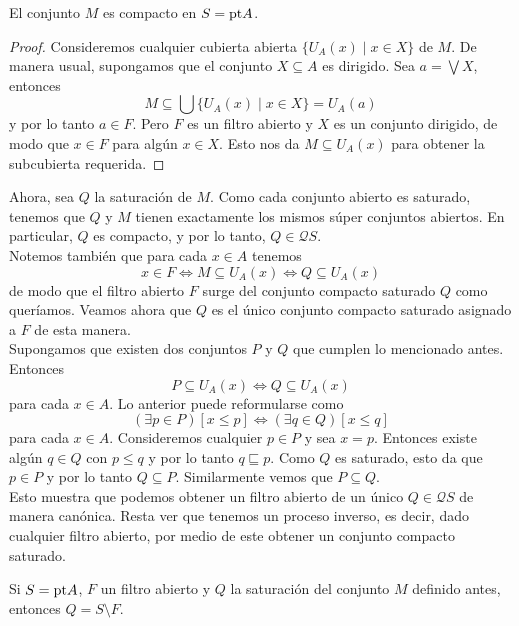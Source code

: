 \begin{lem}
    El conjunto $M$ es compacto en $S=\mathrm{pt} A$.
\end{lem}

\begin{proof}
    Consideremos cualquier cubierta abierta $\{U_A(x)\mid x\in X\}$ de $M$. De manera usual, supongamos que el conjunto $X\subseteq A$ es dirigido. Sea $a=\bigvee X$, entonces
    \[
    M\subseteq \bigcup \{U_A(x)\mid x\in X\}=U_A(a)
    \]
    y por lo tanto $a\in F$. Pero $F$ es un filtro abierto y $X$ es un conjunto dirigido, de modo que $x\in F$ para algún $x\in X$. Esto nos da $M\subseteq U_A(x)$ para obtener la subcubierta requerida.
\end{proof}

Ahora, sea $Q$ la saturación de $M$. Como cada conjunto abierto es saturado, tenemos que $Q$ y $M$ tienen exactamente los mismos súper conjuntos abiertos. En particular, $Q$ es compacto, y por lo tanto, $Q\in \mathcal{Q}S$.\\

Notemos también que para cada $x\in A$ tenemos
\begin{equation}\label{HMcaracterizacion}
x\in F\Leftrightarrow M\subseteq U_A(x)\Leftrightarrow Q\subseteq U_A(x)
\end{equation}
de modo que el filtro abierto $F$ surge del conjunto compacto saturado $Q$ como queríamos. Veamos ahora que $Q$ es el único conjunto compacto saturado asignado a $F$ de esta manera.\\

Supongamos que existen dos conjuntos $P$ y $Q$ que cumplen lo mencionado antes. Entonces 
\[
P\subseteq U_A(x)\Leftrightarrow Q\subseteq U_A(x)
\]
para cada $x\in A$. Lo anterior puede reformularse como 
\[
(\exists p\in P)[x\leq p]\Leftrightarrow (\exists q\in Q)[x\leq q]
\]
para cada $x\in A$. Consideremos cualquier $p\in P$ y sea $x=p$. Entonces existe algún $q\in Q$ con $p\leq q$ y por lo tanto $q\sqsubseteq p$. Como $Q$ es saturado, esto da que $p\in P$ y por lo tanto $Q\subseteq P$. Similarmente vemos que $P\subseteq Q$.\\

Esto muestra que podemos obtener un filtro abierto de un único $Q\in \mathcal{Q}S$ de manera canónica. Resta ver que tenemos un proceso inverso, es decir, dado cualquier filtro abierto, por medio de este obtener un conjunto compacto saturado.

\begin{lem}\label{HM2}
    Si $S=\mathrm{pt} A$, $F$ un filtro abierto y $Q$ la saturación del conjunto $M$ definido antes, entonces $Q=S\setminus F$.
\end{lem}


